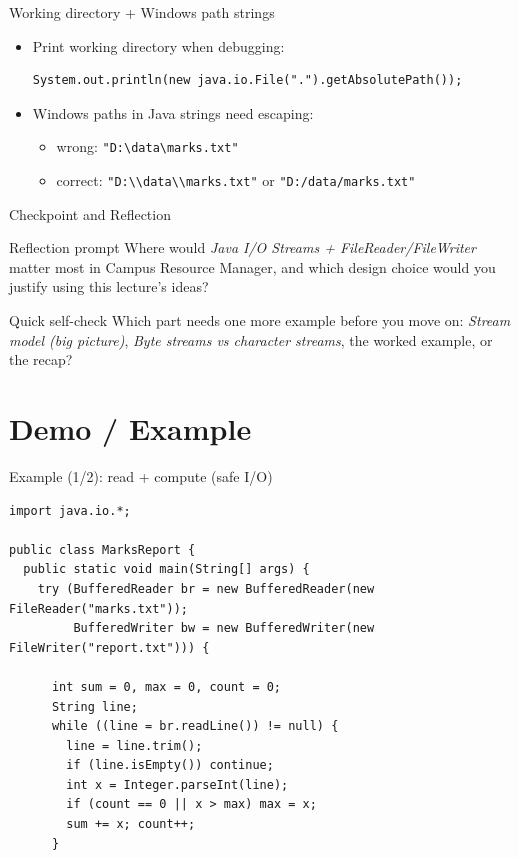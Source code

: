 \documentclass{beamer}
\begin{document}
\begin{frame}[fragile]{Working directory + Windows path strings}
  \begin{itemize}[<+->]
    \item Print working directory when debugging:
      \begin{lstlisting}
System.out.println(new java.io.File(".").getAbsolutePath());
      \end{lstlisting}
    \item Windows paths in Java strings need escaping:
      \begin{itemize}
        \item wrong: \verb|"D:\data\marks.txt"|
        \item correct: \verb|"D:\\data\\marks.txt"| or \verb|"D:/data/marks.txt"|
      \end{itemize}
  \end{itemize}
  \slidesources{\OOPSUnitIIISources}
\end{frame}

\begin{frame}{Checkpoint and Reflection}
\begin{block}{Reflection prompt}
Where would \textit{Java I/O Streams + FileReader/FileWriter} matter most in Campus Resource Manager, and which design choice would you justify using this lecture's ideas?
\end{block}
\begin{block}{Quick self-check}
Which part needs one more example before you move on: \textit{Stream model (big picture)}, \textit{Byte streams vs character streams}, the worked example, or the recap?
\end{block}
  \slidesources{\OOPSUnitIIISources}
\end{frame}

\section{Demo / Example}
\label{sec:demo}

\begin{frame}[fragile,shrink=8]{Example (1/2): read + compute (safe I/O)}
\begin{lstlisting}
import java.io.*;

public class MarksReport {
  public static void main(String[] args) {
    try (BufferedReader br = new BufferedReader(new FileReader("marks.txt"));
         BufferedWriter bw = new BufferedWriter(new FileWriter("report.txt"))) {

      int sum = 0, max = 0, count = 0;
      String line;
      while ((line = br.readLine()) != null) {
        line = line.trim();
        if (line.isEmpty()) continue;
        int x = Integer.parseInt(line);
        if (count == 0 || x > max) max = x;
        sum += x; count++;
      }
\end{lstlisting}
  \slidesources{\OOPSUnitIIISources}
\end{frame}
\end{document}

